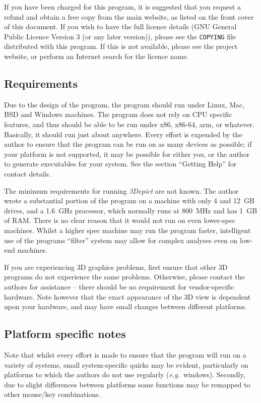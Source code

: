 \documentclass[10pt]{article}
\begin{document}
If you have been charged for this program, it is suggested that you request a refund and obtain a free copy from the main website, as listed on the front cover of this document. If you wish to have the full licence details (GNU General Public Licence Version 3 (or any later version)), please see the \texttt{COPYING} file distributed with this program. If this is not available, please see the project website, or perform an Internet search for the licence name.
 
\subsection{Requirements}
Due to the design of the program, the program should run under Linux, Mac, BSD and Windows machines. The program does not rely on CPU specific features, and thus should be able to be run under x86, x86-64, arm, or whatever. Basically, it should run just about anywhere. Every effort is expended by the author to ensure that the program can be run on as many devices as possible; if your platform is not supported, it may be possible for either you, or the author to generate executables for your system. See the section ``Getting Help'' for contact details.  

The minimum requirements for running \emph{3Depict} are not known. The author wrote a substantial portion of the program on a machine with only 4 and 12~GB drives, and a 1.6~GHz processor, which normally runs at 800~MHz and has 1~GB of RAM. There is no clear reason that it would not run on even lower-spec machines. Whilst a higher spec machine may run the program faster, intelligent use of the programs ``filter'' system may allow for complex analyses even on low-end machines. 

If you are experiencing 3D graphics problems, first ensure that other 3D programs do not experience the same problems. Otherwise, please contact the authors for assistance -- there should be no requirement for vendor-specific hardware. Note however that the exact appearance of the 3D view is dependent upon your hardware, and may have small changes between different platforms. 

\subsection{Platform specific notes}
Note that whilst every effort is made to ensure that the program will run on a variety of systems, small system-specific quirks may be evident, particularly on platforms to which the authors do not use regularly (\emph{e.g.}\ windows). Secondly, due to slight differences between platforms some functions may be remapped to other mouse/key combinations.  
\end{document}
